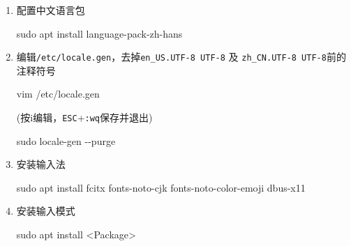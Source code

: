 \documentclass[
]{article}
\newenvironment{Shaded}{}{}
\newcommand{\AttributeTok}[1]{\textcolor[rgb]{0.49,0.56,0.16}{#1}}
\newcommand{\ExtensionTok}[1]{#1}
\newcommand{\FunctionTok}[1]{\textcolor[rgb]{0.02,0.16,0.49}{#1}}
\newcommand{\NormalTok}[1]{#1}
\newcommand{\OperatorTok}[1]{\textcolor[rgb]{0.40,0.40,0.40}{#1}}
\begin{document}
\begin{enumerate}
  \def\labelenumi{\arabic{enumi}.}
  \item
        配置中文语言包

        \begin{Shaded}
          \begin{Highlighting}[]
            \FunctionTok{sudo}\NormalTok{ apt install language{-}pack{-}zh{-}hans}
          \end{Highlighting}
        \end{Shaded}
  \item
        编辑\texttt{/etc/locale.gen}，去掉\texttt{en\_US.UTF-8\ UTF-8} 及
        \texttt{zh\_CN.UTF-8\ UTF-8}前的注释符号

        \begin{Shaded}
          \begin{Highlighting}[]
            \ExtensionTok{vim}\NormalTok{ /etc/locale.gen}
          \end{Highlighting}
        \end{Shaded}

        (按i编辑，\texttt{ESC}+\texttt{:wq}保存并退出)

        \begin{Shaded}
          \begin{Highlighting}[]
            \FunctionTok{sudo}\NormalTok{ locale{-}gen }\AttributeTok{{-}{-}purge}
          \end{Highlighting}
        \end{Shaded}
  \item
        安装输入法

        \begin{Shaded}
          \begin{Highlighting}[]
            \FunctionTok{sudo}\NormalTok{ apt install fcitx fonts{-}noto{-}cjk fonts{-}noto{-}color{-}emoji dbus{-}x11}
          \end{Highlighting}
        \end{Shaded}
  \item
        安装输入模式

        \begin{Shaded}
          \begin{Highlighting}[]
            \FunctionTok{sudo}\NormalTok{ apt install }\OperatorTok{\textless{}}\NormalTok{Package}\OperatorTok{\textgreater{}}
          \end{Highlighting}
        \end{Shaded}


\end{enumerate}
\end{document}
